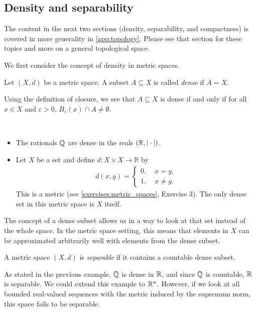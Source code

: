 \documentclass{article}
\begin{document}
\subsection{Density and separability}

The content in the next two sections (density, separability, and compactness) is covered in more generality in \cref{app:topology}. Please see that section for these topics and more on a general topological space.

We first consider the concept of density in metric spaces. 

\begin{definition}
Let $(X,d)$ be a metric space. A subset $A\subseteq X$ is called \emph{dense} if $\overline{A} = X$.
\end{definition}

Using the definition of closure, we see that $A\subseteq X$ is dense if and only if for all $x\in X$ and $\varepsilon>0$, $B_\varepsilon(x)\cap A \neq \emptyset$.


\begin{example}
\textcolor{white}{Skip}
\begin{itemize}
    \item The rationals ${\mathbb{Q}}$ are dense in the reals $({\mathbb{R}},\vert \cdot \vert)$.
    \item Let $X$ be a set and define $d\colon X \times X \to \mathbb{R}$ by 
    \begin{align*}
        d(x,y) = \begin{cases}
            0, & \; x=y, \\
            1, & \; x\neq y.
        \end{cases}
    \end{align*}
    This is a metric (see \cref{exercises:metric_spaces}, Exercise 3). The only dense set in this metric space is $X$ itself. 
\end{itemize}
\end{example}

The concept of a dense subset allows us in a way to look at that set instead of the whole space. In the metric space setting, this means that elements in $X$ can be approximated arbitrarily well with elements from the dense subset.

\begin{definition}
A metric space $(X,d)$ is \emph{separable} if it contains a countable dense subset.
\end{definition}

As stated in the previous example, ${\mathbb{Q}}$ is dense in ${\mathbb{R}}$, and since ${\mathbb{Q}}$ is countable, ${\mathbb{R}}$ is separable. We could extend this example to ${\mathbb{R}}^n$. However, if we look at all bounded real-valued sequences with the metric induced by the supremum norm, this space fails to be separable. 
\end{document}
